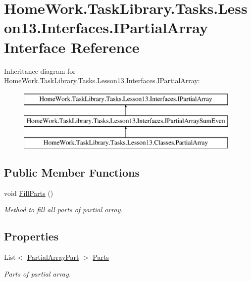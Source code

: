 \hypertarget{interface_home_work_1_1_task_library_1_1_tasks_1_1_lesson13_1_1_interfaces_1_1_i_partial_array}{}\section{Home\+Work.\+Task\+Library.\+Tasks.\+Lesson13.\+Interfaces.\+I\+Partial\+Array Interface Reference}
\label{interface_home_work_1_1_task_library_1_1_tasks_1_1_lesson13_1_1_interfaces_1_1_i_partial_array}
Inheritance diagram for Home\+Work.\+Task\+Library.\+Tasks.\+Lesson13.\+Interfaces.\+I\+Partial\+Array\+:\begin{figure}[H]
\begin{center}
\leavevmode
\includegraphics[height=3.000000cm]{interface_home_work_1_1_task_library_1_1_tasks_1_1_lesson13_1_1_interfaces_1_1_i_partial_array}
\end{center}
\end{figure}
\subsection*{Public Member Functions}
\begin{DoxyCompactItemize}
\item 
void \mbox{\hyperlink{interface_home_work_1_1_task_library_1_1_tasks_1_1_lesson13_1_1_interfaces_1_1_i_partial_array_a8b4b7d6323832908c7c5af53904a9697}{Fill\+Parts}} ()
\begin{DoxyCompactList}\small\item\em Method to fill all parts of partial array. \end{DoxyCompactList}\end{DoxyCompactItemize}
\subsection*{Properties}
\begin{DoxyCompactItemize}
\item 
List$<$ \mbox{\hyperlink{class_home_work_1_1_task_library_1_1_tasks_1_1_lesson13_1_1_classes_1_1_partial_array_part}{Partial\+Array\+Part}} $>$ \mbox{\hyperlink{interface_home_work_1_1_task_library_1_1_tasks_1_1_lesson13_1_1_interfaces_1_1_i_partial_array_a85ea6fbfe8c945007979b41ab35a71d9}{Parts}}
\begin{DoxyCompactList}\small\item\em Parts of partial array. \end{DoxyCompactList}\end{DoxyCompactItemize}



